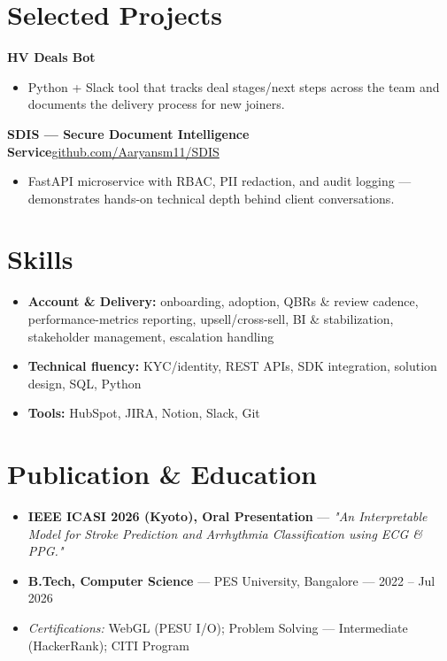 \documentclass[10pt,a4paper]{article}
\begin{document}
\section*{Selected Projects}
\vspace{1pt}\textbf{HV Deals Bot}
\begin{itemize}
\item Python + Slack tool that tracks deal stages/next steps across the team and documents the delivery process for new joiners.
\end{itemize}
\vspace{1pt}\textbf{SDIS --- Secure Document Intelligence Service}\hfill {\small\href{https://github.com/Aaryansm11/SDIS}{github.com/Aaryansm11/SDIS}}
\begin{itemize}
\item FastAPI microservice with RBAC, PII redaction, and audit logging --- demonstrates hands-on technical depth behind client conversations.
\end{itemize}
\section*{Skills}
\begin{itemize}
\item \textbf{Account \& Delivery:} onboarding, adoption, QBRs \& review cadence, performance-metrics reporting, upsell/cross-sell, BI \& stabilization, stakeholder management, escalation handling
\item \textbf{Technical fluency:} KYC/identity, REST APIs, SDK integration, solution design, SQL, Python
\item \textbf{Tools:} HubSpot, JIRA, Notion, Slack, Git
\end{itemize}
\section*{Publication \& Education}
\begin{itemize}
\item \textbf{IEEE ICASI 2026 (Kyoto), Oral Presentation} --- \textit{"An Interpretable Model for Stroke Prediction and Arrhythmia Classification using ECG \& PPG."}
\item \textbf{B.Tech, Computer Science} --- PES University, Bangalore --- 2022 -- Jul 2026
\item \textit{Certifications:} WebGL (PESU I/O); Problem Solving --- Intermediate (HackerRank); CITI Program
\end{itemize}
\end{document}
